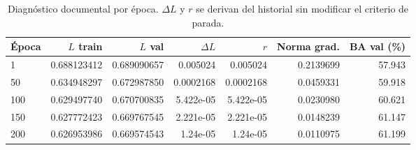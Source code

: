 \begin{table}[htbp]
\centering\small
\caption{Diagnóstico documental por época. $\Delta L$ y $r$ se derivan del historial sin modificar el criterio de parada.}\label{tab:conv-l}
\begin{tabular}{lrrrrrr}\toprule
Época & $L$ train & $L$ val & $\Delta L$ & $r$ & Norma grad. & BA val (\%) \\ \midrule
1 & 0.688123412 & 0.689090657 & 0.005024 & 0.005024 & 0.2139699 & 57.943 \\
50 & 0.634948297 & 0.672987850 & 0.0002168 & 0.0002168 & 0.0459331 & 59.918 \\
100 & 0.629497740 & 0.670700835 & 5.422e-05 & 5.422e-05 & 0.0230980 & 60.621 \\
150 & 0.627772423 & 0.669767545 & 2.221e-05 & 2.221e-05 & 0.0148239 & 61.147 \\
200 & 0.626953986 & 0.669574543 & 1.24e-05 & 1.24e-05 & 0.0110975 & 61.199 \\
\bottomrule\end{tabular}
\end{table}
